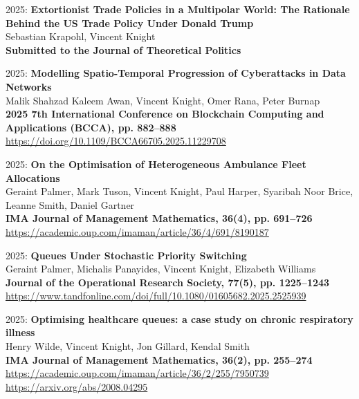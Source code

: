 \documentclass[10pt]{article}
\begin{document}
\begin{etaremune}
\item
  2025: \textbf{Extortionist Trade Policies in a Multipolar World: The Rationale Behind the US Trade Policy Under Donald Trump}\\
  Sebastian Krapohl, Vincent Knight\\
  \textbf{Submitted to the Journal of Theoretical Politics}\\
  
  

\item
  2025: \textbf{Modelling Spatio-Temporal Progression of Cyberattacks in Data Networks}\\
  Malik Shahzad Kaleem Awan, Vincent Knight, Omer Rana, Peter Burnap\\
  \textbf{2025 7th International Conference on Blockchain Computing and Applications (BCCA), pp. 882--888}\\
  \url{https://doi.org/10.1109/BCCA66705.2025.11229708}\\
  

\item
  2025: \textbf{On the Optimisation of Heterogeneous Ambulance Fleet Allocations}\\
  Geraint Palmer, Mark Tuson, Vincent Knight, Paul Harper, Syaribah Noor Brice, Leanne Smith, Daniel Gartner\\
  \textbf{IMA Journal of Management Mathematics, 36(4), pp. 691--726}\\
  \url{https://academic.oup.com/imaman/article/36/4/691/8190187}\\
  

\item
  2025: \textbf{Queues Under Stochastic Priority Switching}\\
  Geraint Palmer, Michalis Panayides, Vincent Knight, Elizabeth Williams\\
  \textbf{Journal of the Operational Research Society, 77(5), pp. 1225--1243}\\
  \url{https://www.tandfonline.com/doi/full/10.1080/01605682.2025.2525939}\\
  

\item
  2025: \textbf{Optimising healthcare queues: a case study on chronic respiratory illness}\\
  Henry Wilde, Vincent Knight, Jon Gillard, Kendal Smith\\
  \textbf{IMA Journal of Management Mathematics, 36(2), pp. 255--274}\\
  \url{https://academic.oup.com/imaman/article/36/2/255/7950739}\\
  \url{https://arxiv.org/abs/2008.04295}\\


\end{etaremune}
\end{document}
